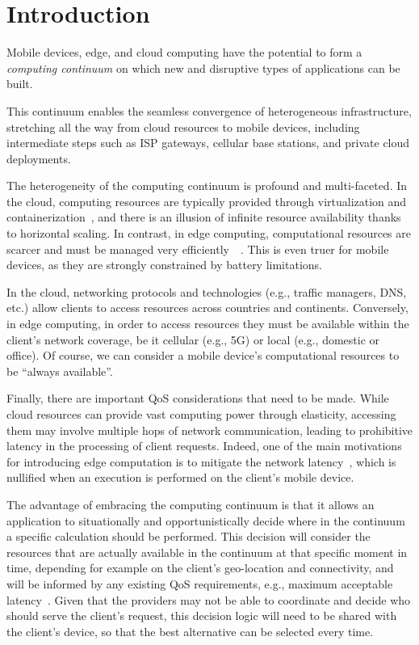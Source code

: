 \section{Introduction}
\label{sec:intro}

Mobile devices, edge, and cloud computing have the potential to form a \textit{computing continuum} on which new and disruptive types of applications can be built. %

This continuum enables the seamless convergence of heterogeneous infrastructure, stretching all the way from cloud resources to mobile devices, including intermediate steps such as ISP gateways, cellular base stations, and private cloud deployments.  

The heterogeneity of the computing continuum is profound and multi-faceted. In the cloud, computing resources are typically provided through virtualization and containerization~\cite{leitner2016patterns, Quatrocchi2016discrete}, and there is an illusion of infinite resource availability thanks to horizontal scaling. In contrast, in edge computing, computational resources are scarcer and must be managed very efficiently~\cite{Dehos14millimeter5g}~\cite{GarrigaMendonca2017}. This is even truer for mobile devices, as they are strongly constrained by battery limitations. 

In the cloud, networking protocols and technologies (e.g., traffic managers, DNS, etc.) allow clients to access resources across countries and continents. Conversely, in edge computing, in order to access resources they must be available within the client's network coverage, be it cellular (e.g., 5G) or local (e.g., domestic or office). Of course, we can consider a mobile device's computational resources  to be ``always available''.  

Finally, there are important QoS considerations that need to be made. While cloud resources can provide vast computing power through elasticity, accessing them may involve multiple hops of network communication, leading to prohibitive latency in the processing of client requests. Indeed, one of the main motivations for introducing edge computation is to mitigate the network latency~\cite{Shi:2016}, which is nullified when an execution is performed on the client's mobile device.

The advantage of embracing the computing continuum is that it allows an application to situationally and opportunistically decide where in the continuum a specific calculation should be performed. This decision will consider the resources that are actually available in the continuum at that specific moment in time, depending for example on the client's geo-location and connectivity, and will be informed by any existing QoS requirements, e.g., maximum acceptable latency~\cite{GuptaIfogSim17}. Given that the providers may not be able to coordinate and decide who should serve the client's request, this decision logic will need to be shared with the client's device, so that the best alternative can be selected every time.

